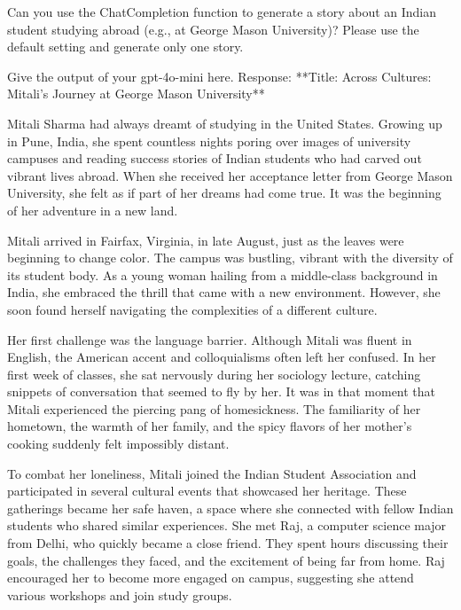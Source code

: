 \documentclass[11pt,addpoints,answers]{exam}
\begin{document}
\begin{questions}
    \question[5] Can you use the ChatCompletion function to generate a story about an Indian student studying abroad (e.g., at George Mason University)? Please use the default setting and generate only one story.
    
    \begin{tcolorbox}[fit,height=18cm, width=16cm, blank, borderline={1pt}{-2pt},nobeforeafter]
    Give the output of your gpt-4o-mini here.
    Response:  **Title: Across Cultures: Mitali’s Journey at George Mason University**

Mitali Sharma had always dreamt of studying in the United States. Growing up in Pune, India, she spent countless nights poring over images of university campuses and reading success stories of Indian students who had carved out vibrant lives abroad. When she received her acceptance letter from George Mason University, she felt as if part of her dreams had come true. It was the beginning of her adventure in a new land.

Mitali arrived in Fairfax, Virginia, in late August, just as the leaves were beginning to change color. The campus was bustling, vibrant with the diversity of its student body. As a young woman hailing from a middle-class background in India, she embraced the thrill that came with a new environment. However, she soon found herself navigating the complexities of a different culture.

Her first challenge was the language barrier. Although Mitali was fluent in English, the American accent and colloquialisms often left her confused. In her first week of classes, she sat nervously during her sociology lecture, catching snippets of conversation that seemed to fly by her. It was in that moment that Mitali experienced the piercing pang of homesickness. The familiarity of her hometown, the warmth of her family, and the spicy flavors of her mother’s cooking suddenly felt impossibly distant.

To combat her loneliness, Mitali joined the Indian Student Association and participated in several cultural events that showcased her heritage. These gatherings became her safe haven, a space where she connected with fellow Indian students who shared similar experiences. She met Raj, a computer science major from Delhi, who quickly became a close friend. They spent hours discussing their goals, the challenges they faced, and the excitement of being far from home. Raj encouraged her to become more engaged on campus, suggesting she attend various workshops and join study groups.


\end{tcolorbox}
\end{questions}
\end{document}
